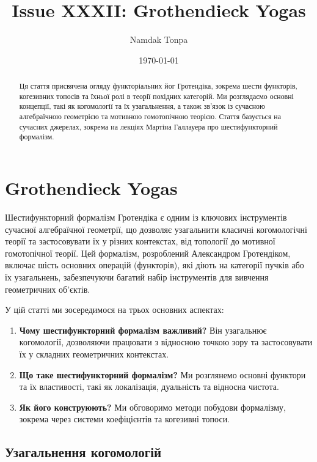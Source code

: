 \documentclass{article}
\begin{document}
\title{Issue XXXII: Grothendieck Yogas}
\author{Namdak Tonpa}
\date{\today}

\maketitle

\begin{abstract}
Ця стаття присвячена огляду функторіальних йог Гротендіка,
зокрема шести функторів, когезивних топосів та їхньої ролі
в теорії похідних категорій. Ми розглядаємо основні концепції,
такі як когомології та їх узагальнення, а також зв’язок із сучасною
алгебраїчною геометрією та мотивною гомотопічною теорією.
Стаття базується на сучасних джерелах, зокрема на лекціях
Мартіна Галлауера про шестифункторний формалізм.
\end{abstract}

\ifincludeTOC
  \tableofcontents
\fi

\section{Grothendieck Yogas}

Шестифункторний формалізм Гротендіка є одним із ключових інструментів сучасної алгебраїчної геометрії, що дозволяє узагальнити класичні когомологічні теорії та застосовувати їх у різних контекстах, від топології до мотивної гомотопічної теорії. Цей формалізм, розроблений Александром Гротендіком, включає шість основних операцій (функторів), які діють на категорії пучків або їх узагальнень, забезпечуючи багатий набір інструментів для вивчення геометричних об’єктів.

У цій статті ми зосередимося на трьох основних аспектах:
\begin{enumerate}
    \item \textbf{Чому шестифункторний формалізм важливий?} Він узагальнює когомології, дозволяючи працювати з відносною точкою зору та застосовувати їх у складних геометричних контекстах.
    \item \textbf{Що таке шестифункторний формалізм?} Ми розглянемо основні функтори та їх властивості, такі як локалізація, дуальність та відносна чистота.
    \item \textbf{Як його конструюють?} Ми обговоримо методи побудови формалізму, зокрема через системи коефіцієнтів та когезивні топоси.
\end{enumerate}

\subsection{Узагальнення когомологій}
\end{document}
